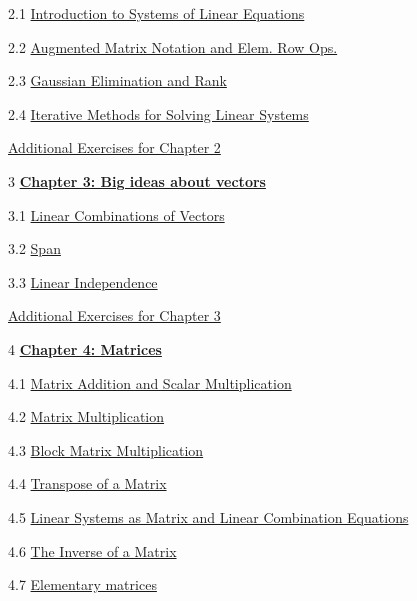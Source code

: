 \documentclass{ximera}
\begin{document}
2.1	\href{https://ximera.osu.edu/oerlinalg/LinearAlgebra/SYS-0020/main}{Introduction to Systems of Linear Equations}
	
2.2	\href{https://ximera.osu.edu/oerlinalg/LinearAlgebra/SYS-0030/main}{Augmented Matrix Notation and Elem. Row Ops.}
	
2.3	\href{https://ximera.osu.edu/oerlinalg/LinearAlgebra/SYS-0030/main}{Gaussian Elimination and Rank}
	
2.4	\href{https://ximera.osu.edu/oerlinalg/LinearAlgebra/SYS-0040/main}{Iterative Methods for Solving Linear Systems}
	
	\href{https://ximera.osu.edu/oerlinalg/LinearAlgebra/SUPX-0020/main}{Additional Exercises for Chapter 2}
	
3	\href{https://ximera.osu.edu/oerlinalg/LinearAlgebra/XLAChapter_bigIdeas/main}{\textbf{Chapter 3: Big ideas about vectors}}
	
3.1	\href{https://ximera.osu.edu/oerlinalg/LinearAlgebra/VEC-0040/main}{Linear Combinations of Vectors}
	
3.2	\href{https://ximera.osu.edu/oerlinalg/LinearAlgebra/VEC-0090/main}{Span}
	
3.3	\href{https://ximera.osu.edu/oerlinalg/LinearAlgebra/VEC-0100/main}{Linear Independence}
	
	\href{https://ximera.osu.edu/oerlinalg/LinearAlgebra/SUPX-0030/main}{Additional Exercises for Chapter 3}
	
4	\href{https://ximera.osu.edu/oerlinalg/LinearAlgebra/XLAChapter_matrices/main}{\textbf{Chapter 4: Matrices}}
	
4.1	\href{https://ximera.osu.edu/oerlinalg/LinearAlgebra/MAT-0010/main}{Matrix Addition and Scalar Multiplication}
	
4.2	\href{https://ximera.osu.edu/oerlinalg/LinearAlgebra/MAT-0020/main}{Matrix Multiplication}
	
4.3	\href{https://ximera.osu.edu/oerlinalg/LinearAlgebra/MAT-0023/main}{Block Matrix Multiplication}
	
4.4	\href{https://ximera.osu.edu/oerlinalg/LinearAlgebra/MAT-0025/main}{Transpose of a Matrix}
	
4.5	\href{https://ximera.osu.edu/oerlinalg/LinearAlgebra/MAT-0030/main}{Linear Systems as Matrix and Linear Combination Equations}
	
4.6	\href{https://ximera.osu.edu/oerlinalg/LinearAlgebra/MAT-0050/main}{The Inverse of a Matrix}
	
4.7	\href{https://ximera.osu.edu/oerlinalg/LinearAlgebra/MAT-0060/main}{Elementary matrices}
	
\end{document}
